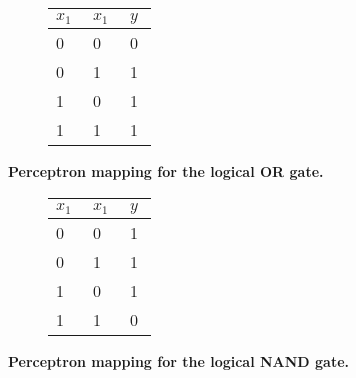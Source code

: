 \begin{figure}[!htp]
    \centering
    \begin{subfigure}[b]{0.70\textwidth}
        \centering
        
        \captionsetup{format=hang} %
        \label{fig:perceptron:or:mapping}
    \end{subfigure}\hfil
    \begin{subfigure}[b]{0.29\textwidth}
        \centering
        \renewcommand{\arraystretch}{1.5}
        \begin{tabular}{C{0.1\linewidth}C{0.1\linewidth}|C{0.1\linewidth}}
            \hline
            $x_1$ & $x_1$ & $y$ \\      & 0     & 0   \\
            0     & 1     & 1   \\
            1     & 0     & 1   \\
            1     & 1     & 1
        \end{tabular}
        \vspace{0.5cm}
        \label{fig:perceptron:or:truth}
    \end{subfigure}\hfil
    \captionsetup{format=hang} %
    \caption{
        \textbf{Perceptron mapping for the logical OR gate.}
    }
    \label{fig:perceptron:or}
\end{figure}

\begin{figure}[!htp]
    \centering
    \begin{subfigure}[b]{0.70\textwidth}
        \centering
        
        \captionsetup{format=hang} %
        \label{fig:perceptron:nand:mapping}
    \end{subfigure}\hfil
    \begin{subfigure}[b]{0.29\textwidth}
        \centering
        \renewcommand{\arraystretch}{1.5}
        \begin{tabular}{C{0.1\linewidth}C{0.1\linewidth}|C{0.1\linewidth}}
            \hline
            $x_1$ & $x_1$ & $y$ \\      & 0     & 1   \\
            0     & 1     & 1   \\
            1     & 0     & 1   \\
            1     & 1     & 0
        \end{tabular}
        \vspace{0.5cm}
        \label{fig:perceptron:nand:truth}
    \end{subfigure}\hfil
    \captionsetup{format=hang} %
    \caption{
        \textbf{Perceptron mapping for the logical NAND gate.}
    }
    \label{fig:perceptron:nand}
\end{figure}

